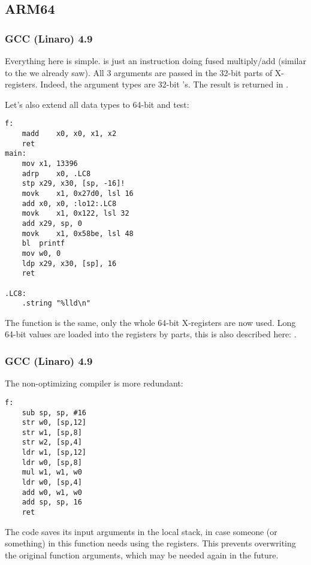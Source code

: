 \subsection{ARM64}

\subsubsection{\Optimizing GCC (Linaro) 4.9}

Everything here is simple.
 is just an instruction doing fused multiply/add (similar to the  we already saw).
All 3 arguments are passed in the 32-bit parts of X-registers.
Indeed, the argument types are 32-bit 's.
The result is returned in .



Let's also extend all data types to 64-bit  and test:



\begin{lstlisting}
f:
	madd	x0, x0, x1, x2
	ret
main:
	mov	x1, 13396
	adrp	x0, .LC8
	stp	x29, x30, [sp, -16]!
	movk	x1, 0x27d0, lsl 16
	add	x0, x0, :lo12:.LC8
	movk	x1, 0x122, lsl 32
	add	x29, sp, 0
	movk	x1, 0x58be, lsl 48
	bl	printf
	mov	w0, 0
	ldp	x29, x30, [sp], 16
	ret

.LC8:
	.string	"%lld\n"
\end{lstlisting}

The \ttf{} function is the same, only the whole 64-bit X-registers are now used.
Long 64-bit values are loaded into the registers by parts, this is also described here: .

\subsubsection{\NonOptimizing GCC (Linaro) 4.9}

The non-optimizing compiler is more redundant:

\begin{lstlisting}
f:
	sub	sp, sp, #16
	str	w0, [sp,12]
	str	w1, [sp,8]
	str	w2, [sp,4]
	ldr	w1, [sp,12]
	ldr	w0, [sp,8]
	mul	w1, w1, w0
	ldr	w0, [sp,4]
	add	w0, w1, w0
	add	sp, sp, 16
	ret
\end{lstlisting}

The code saves its input arguments in the local stack, 
in case someone (or something) in this function needs using the  
registers. This prevents overwriting the original
function arguments, which may be needed again in the future.

